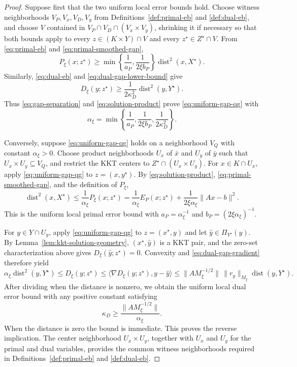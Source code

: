 \documentclass[letterpaper]{article} %
\theoremstyle{definition}
\theoremstyle{remark}
\begin{document}
\begin{proof}
Suppose first that the two uniform local error bounds hold.  Choose witness
neighborhoods $V_P,V_x,V_D,V_y$ from
Definitions~\ref{def:primal-eb} and \ref{def:dual-eb}, and choose $V$
contained in $V_P\cap V_D\cap(V_x\times V_y)$, shrinking it if necessary so
that both bounds apply to every $z\in(K\times Y)\cap V$ and every
$z^\star\in Z^\star\cap V$.  From \eqref{eq:primal-eb} and
\eqref{eq:primal-smoothed-gap},
\[
    P_\xi(x;z^\star)
    \ge
    \min\left\{\frac1{a_P},\frac1{2\xi b_P}\right\}
    \operatorname{dist}^2(x,X^\star).
\]
Similarly, \eqref{eq:dual-eb} and \eqref{eq:dual-gap-lower-bound} give
\[
    D_\xi(y;z^\star)
    \ge
    \frac1{2\kappa_D^2}
    \operatorname{dist}^2(y,Y^\star).
\]
Thus \eqref{eq:gap-separation} and \eqref{eq:solution-product} prove
\eqref{eq:uniform-gap-qg} with
\[
    \alpha_\xi
    =
    \min\left\{
        \frac1{a_P},
        \frac1{2\xi b_P},
        \frac1{2\kappa_D^2}
    \right\}.
\]

Conversely, suppose \eqref{eq:uniform-gap-qg} holds on a neighborhood
$V_Q$ with constant $\alpha_\xi>0$.  Choose product neighborhoods $U_x$ of
$\bar x$ and $U_y$ of $\bar y$ such that $U_x\times U_y\subseteq V_Q$, and
restrict the KKT centers to $Z^\star\cap(U_x\times U_y)$.  For
$x\in K\cap U_x$, apply \eqref{eq:uniform-gap-qg} to
$z=(x,y^\star)$.  By \eqref{eq:solution-product},
\eqref{eq:primal-smoothed-gap}, and the definition of $P_\xi$,
\[
    \operatorname{dist}^2(x,X^\star) \le \frac1{\alpha_\xi}P_\xi(x;z^\star) = \frac1{\alpha_\xi}E_P(x;z^\star) +\frac1{2\xi\alpha_\xi}\|Ax-b\|^2.
\]
This is the uniform local primal error bound with
$a_P=\alpha_\xi^{-1}$ and $b_P=(2\xi\alpha_\xi)^{-1}$.

For $y\in Y\cap U_y$, apply \eqref{eq:uniform-gap-qg} to
$z=(x^\star,y)$ and let $\widehat y\in\Pi_{Y^\star}(y)$.  By
Lemma~\ref{lem:kkt-solution-geometry}, $(x^\star,\widehat y)$ is a KKT pair, and the
zero-set characterization above gives
$D_\xi(\widehat y;z^\star)=0$.  Convexity and
\eqref{eq:dual-gap-gradient} therefore yield
\[
    \alpha_\xi\operatorname{dist}^2(y,Y^\star) \le D_\xi(y;z^\star) \le \langle\nabla D_\xi(y;z^\star),y-\widehat y\rangle \le \|A M_\xi^{-1/2}\|\, \|r_y\|_{M_\xi}\operatorname{dist}(y,Y^\star).
\]
After dividing when the distance is nonzero, we obtain the uniform local
dual error bound with any positive constant satisfying
\[
    \kappa_D
    \ge
    \frac{\|A M_\xi^{-1/2}\|}{\alpha_\xi}.
\]
When the distance is zero the bound is immediate.  This proves the reverse
implication.  The center neighborhood $U_x\times U_y$, together with $U_x$
and $U_y$ for the primal and dual variables, provides the common witness
neighborhoods required in Definitions~\ref{def:primal-eb} and
\ref{def:dual-eb}.
\end{proof}
\end{document}
